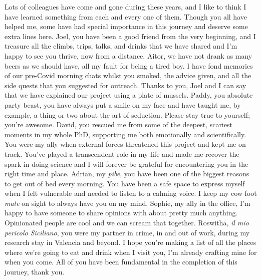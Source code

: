Lots of colleagues have come and gone during these years, and I like to think I have learned something from each and every one of them. Though you all have helped me, some have had special importance in this journey and deserve some extra lines here. Joel, you have been a good friend from the very beginning, and I treasure all the climbs, trips, talks, and drinks that we have shared and I'm happy to see you thrive, now from a distance. Aitor, we have not drank as many beers as we should have, all my fault for being a tired boy. I have fond memories of our pre-Covid morning chats whilst you smoked, the advice given, and all the side quests that you suggested for outreach. Thanks to you, Joel and I can say that we have explained our project using a plate of mussels. Paddy, you absolute party beast, you have always put a smile on my face and have taught me, by example, a thing or two about the art of seduction. Please stay true to yourself; you're awesome. David, you rescued me from some of the deepest, scariest moments in my whole PhD, supporting me both emotionally and scientifically. You were my ally when external forces threatened this project and kept me on track. You've played a transcendent role in my life and made me recover the spark in doing science and I will forever be grateful for encountering you in the right time and place. Adrian, my \textit{pibe}, you have been one of the biggest reasons to get out of bed every morning. You have been a safe space to express myself when I felt vulnerable and needed to listen to a calming voice. I keep my cow foot \textit{mate} on sight to always have you on my mind. Sophie, my ally in the office, I'm happy to have someone to share opinions with about pretty much anything. Opinionated people are cool and we can scream that together. Roswitha, \textit{il mio pericolo Siciliano}, you were my partner in crime, in and out of work, during my research stay in Valencia and beyond. I hope you're making a list of all the places where we're going to eat and drink when I visit you, I'm already crafting mine for when you come. All of you have been fundamental in the completion of this journey, thank you.

